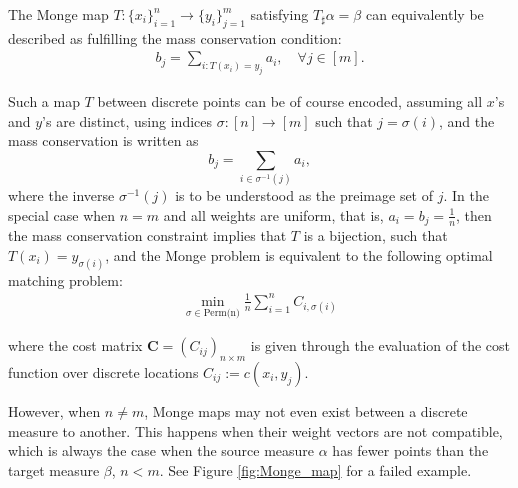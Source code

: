 \documentclass[11pt]{book}
\begin{document}
The Monge map $T: \{x_i\}_{i=1}^n \to \{y_i\}_{j=1}^m $ satisfying $T_\sharp \alpha = \beta$ can equivalently be described as fulfilling the mass conservation condition:
\begin{align}\label{eqn:Monge_map_mass_conservation}
b_j = \sum_{i: T(x_i)=y_j} a_i, \quad \forall j \in [m].
\end{align}

Such a map $T$ between discrete points can be of course encoded, assuming all \(x\)'s and \(y\)'s are distinct, using indices \( \sigma: [n] \rightarrow [m] \) such that \( j = \sigma(i) \), and the mass conservation is written as
\[
b_j = \sum_{i \in \sigma^{-1}(j)} a_i,
\]
where the inverse \(\sigma^{-1}(j)\) is to be understood as the preimage set of \(j\). In the special case when \( n = m \) and all weights are uniform, that is, \( a_i = b_j = \frac{1}{n} \), then the mass conservation constraint implies that \( T \) is a bijection, such that \( T(x_i) = y_{\sigma(i)} \), and the Monge problem is equivalent to the following optimal matching problem:
\begin{align}
\min_{\sigma \in \text{Perm(n)}} \frac{1}{n} \sum_{i=1}^n C_{i,\sigma(i)}
\end{align}

where the cost matrix $\mathbf{C} = (C_{ij})_{n\times m}$ is given through the evaluation of the cost function over discrete locations $C_{ij} := c(x_i, y_j)$.

However, when \( n \neq m \), Monge maps may not even exist between a discrete measure to another. This happens when their weight vectors are not compatible, which is always the case when the source measure $\alpha$ has fewer points than the target measure $\beta$, \( n < m \). See Figure \ref{fig:Monge_map} for a failed example.
\end{document}
